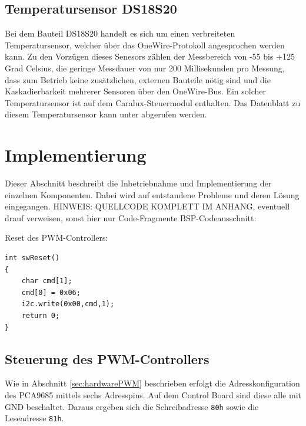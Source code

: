 \documentclass[a4paper,12pt]{scrartcl}
\begin{document}
\subsection{Temperatursensor DS18S20}
Bei dem Bauteil DS18S20 handelt es sich um einen verbreiteten Temperatursensor, welcher über das OneWire-Protokoll angesprochen werden kann. Zu den Vorzügen dieses Senesors zählen der Messbereich von -55 bis +125 Grad Celsius, die geringe Messdauer von nur 200 Millisekunden pro Messung, dass zum Betrieb keine zusätzlichen, externen Bauteile nötig sind und die Kaskadierbarkeit mehrerer Sensoren über den OneWire-Bus. Ein solcher Temperatursensor ist auf dem Caralux-Steuermodul enthalten. Das Datenblatt zu diesem Temperatursensor kann unter \cite{specds1820} abgerufen werden.

\clearpage
\section{Implementierung}
Dieser Abschnitt beschreibt die Inbetriebnahme und Implementierung der einzelnen Komponenten. Dabei wird auf entstandene Probleme und deren Lösung eingegangen.
HINWEIS: QUELLCODE KOMPLETT IM ANHANG, eventuell drauf verweisen, sonst hier nur Code-Fragmente
BSP-Codeausschnitt:

Reset des PWM-Controllers:
\begin{lstlisting}[captionpos=b, caption=Code-Ausschnitt: Software-Reset des PWM-Controllers, label=codeswreset]
int swReset()
{
    char cmd[1];
    cmd[0] = 0x06;
    i2c.write(0x00,cmd,1);
    return 0;
}
\end{lstlisting}


\subsection{Steuerung des PWM-Controllers}
Wie in Abschnitt \ref{sec:hardwarePWM} beschrieben erfolgt die Adresskonfiguration des PCA9685 mittels sechs Adresspins. Auf dem Control Board sind diese alle mit GND beschaltet. Daraus ergeben sich die Schreibadresse \texttt{80h} sowie die Leseadresse \texttt{81h}.
\end{document}
